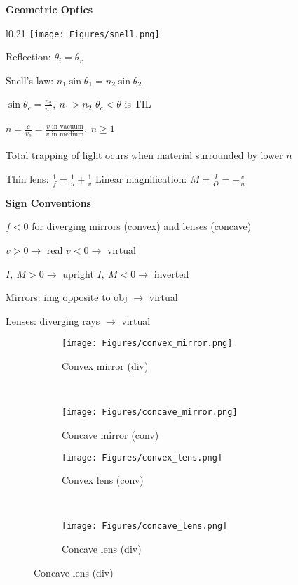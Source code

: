 \documentclass[twocolumn]{article}
\begin{document}
\dotfill

\textbf{Geometric Optics}

\begin{wrapfigure}[4]{l}{0.21\columnwidth} \vspace{-1.5em}
    \texttt{[image: Figures/snell.png]}
\end{wrapfigure}

Reflection: $\theta_i = \theta_r$

Snell's law: $n_1 \sin \theta_1 = n_2 \sin \theta_2$

$\sin \theta_c = \frac{n_2}{n_1},\ n_1 > n_2$ \hfill $\theta_c < \theta$ is TIL

$n = \frac{c}{v_p} = \frac{v \text{ in vacuum}}{v \text{  in medium}},\ n \geq 1$ \vspace{5pt}

Total trapping of light ocurs when material surrounded by lower $n$

Thin lens: $\frac{1}{f} = \frac{1}{u} + \frac{1}{v}$ \hfill Linear magnification: $M = \frac{I}{O} = -\frac{v}{u}$

\textbf{Sign Conventions}

$f < 0$ for diverging mirrors (convex) and lenses (concave)

$v > 0 \rightarrow$ real \hspace{10.65em} $v < 0 \rightarrow$ virtual

$I,\ M > 0 \rightarrow$ upright \hspace{7.25em} $I,\ M < 0 \rightarrow$ inverted

Mirrors: img opposite to obj $\rightarrow$ virtual

Lenses: diverging rays $\rightarrow$ virtual


\newpage


\begin{figure}
    \centering
    \begin{subfigure}[t]{0.45\columnwidth}
        \centering
        \texttt{[image: Figures/convex\_mirror.png]}
        \caption{Convex mirror (div)}
    \end{subfigure}%
    ~
    \begin{subfigure}[t]{0.45\columnwidth}
        \centering
        \texttt{[image: Figures/concave\_mirror.png]}
        \caption{Concave mirror (conv)}
    \end{subfigure}

    \begin{subfigure}[t]{0.45\columnwidth}
        \centering
        \texttt{[image: Figures/convex\_lens.png]}
        \caption{Convex lens (conv)}
    \end{subfigure}%
    ~
    \begin{subfigure}[t]{0.45\columnwidth}
        \centering
        \texttt{[image: Figures/concave\_lens.png]}
        \caption{Concave lens (div)}
    \end{subfigure}
\end{figure} \ \\[-5em]
\end{document}
